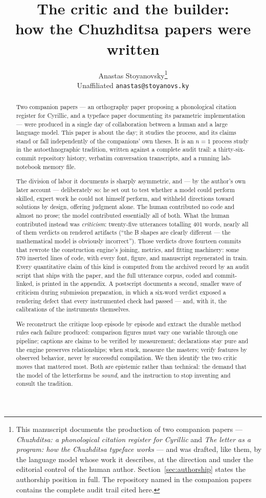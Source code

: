 \documentclass[11pt]{article}
\title{\textbf{The critic and the builder:\\ how the Chuzhditsa papers were written}}
\author{Anastas Stoyanovsky\thanks{This manuscript documents the production of two companion papers — \emph{Chuzhditsa: a phonological citation register for Cyrillic} and \emph{The letter as a program: how the Chuzhditsa typeface works} — and was drafted, like them, by the language model whose work it describes, at the direction and under the editorial control of the human author. Section~\ref{sec:authorship} states the authorship position in full. The repository named in the companion papers contains the complete audit trail cited here.}\\[3pt] {\normalsize Unaffiliated \quad \texttt{anastas@stoyanovs.ky}}}
\date{}
\begin{document}
\maketitle

\begin{abstract}
\noindent Two companion papers — an orthography paper proposing a phonological citation register for Cyrillic, and a typeface paper documenting its parametric implementation — were produced in a single day of collaboration between a human and a large language model. This paper is about the day; it studies the process, and its claims stand or fall independently of the companions' own theses. It is an $n{=}1$ process study in the autoethnographic tradition, written against a complete audit trail: a thirty-six-commit repository history, verbatim conversation transcripts, and a running lab-notebook memory file.

The division of labor it documents is sharply asymmetric, and — by the author's own later account — deliberately so: he set out to test whether a model could perform skilled, expert work he could not himself perform, and withheld directions toward solutions by design, offering judgment alone. The human contributed no code and almost no prose; the model contributed essentially all of both. What the human contributed instead was \emph{criticism}: twenty-five utterances totalling 401 words, nearly all of them verdicts on rendered artifacts (``the B shapes are clearly different — the mathematical model is obviously incorrect''). Those verdicts drove fourteen commits that rewrote the construction engine's joining, metrics, and fitting machinery: some 570 inserted lines of code, with every font, figure, and manuscript regenerated in train. Every quantitative claim of this kind is computed from the archived record by an audit script that ships with the paper, and the full utterance corpus, coded and commit-linked, is printed in the appendix. A postscript documents a second, smaller wave of criticism during submission preparation, in which a six-word verdict exposed a rendering defect that every instrumented check had passed — and, with it, the calibrations of the instruments themselves.

We reconstruct the critique loop episode by episode and extract the durable method rules each failure produced: comparison figures must vary one variable through one pipeline; captions are claims to be verified by measurement; declarations stay pure and the engine preserves relationships; when stuck, measure the masters; verify features by observed behavior, never by successful compilation. We then identify the two critic moves that mattered most. Both are epistemic rather than technical: the demand that the model of the letterforms be \emph{sound}, and the instruction to stop inventing and consult the tradition.


\end{abstract}
\end{document}
